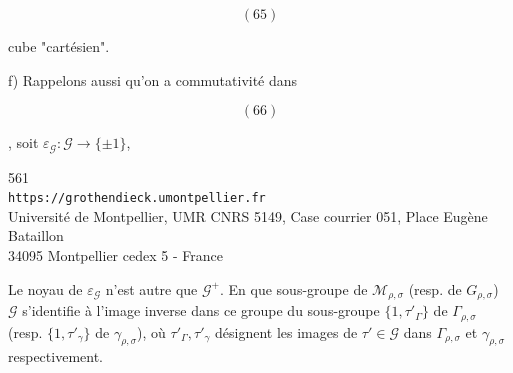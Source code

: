 \begin{samepage}
\[
(65)
\]
\end{samepage}
cube "cartésien".

f) Rappelons aussi qu'on a commutativité dans
\begin{samepage}
\[
(66)
\]
\end{samepage}
, soit \(\varepsilon_{\mathcal G}:\mathcal G\longrightarrow\{\pm1\}\),


{\small
\begin{center}
561\\
\texttt{https://grothendieck.umontpellier.fr}\\
Université de Montpellier, UMR CNRS 5149, Case courrier 051, Place Eugène Bataillon\\
34095 Montpellier cedex 5 - France
\end{center}
}


Le noyau de $\varepsilon_{\mathcal{G}}$ n'est autre que $\mathcal{G}^{+}$. En  que sous-groupe de $\mathcal M_{\rho,\sigma}$ (resp. de $G_{\rho,\sigma}$) $\mathcal{G}$ s'identifie à l'image inverse dans ce groupe du sous-groupe $\{1,\tau'_{\Gamma}\}$ de $\Gamma_{\rho,\sigma}$ (resp.  $\{1,\tau'_{\gamma}\}$ de $\gamma_{\rho,\sigma}$), où $\tau'_{\Gamma},\tau'_{\gamma}$ désignent les images de $\tau'\in\mathcal{G}$ dans $\Gamma_{\rho,\sigma}$ et $\gamma_{\rho,\sigma}$ respectivement.

